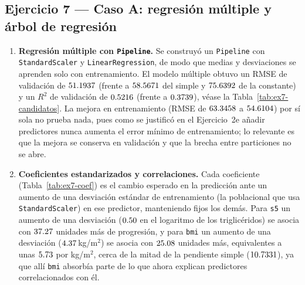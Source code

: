 \subsection{Ejercicio 7 --- Caso A: regresión múltiple y árbol de regresión}

\begin{enumerate}

\item \textbf{Regresión múltiple con \texttt{Pipeline}.}
Se construyó un \texttt{Pipeline} con \texttt{StandardScaler} y
\texttt{LinearRegression}, de modo que medias y desviaciones se aprenden solo
con entrenamiento. El modelo múltiple obtuvo un RMSE de validación de
$51.1937$ (frente a $58.5671$ del simple y
$75.6392$ de la constante) y un $R^2$ de validación de
$0.5216$ (frente a $0.3739$), véase la
Tabla~\ref{tab:ex7-candidatos}. La mejora en entrenamiento (RMSE de
$63.3458$ a $54.6104$) por sí sola no prueba nada, pues como
se justificó en el Ejercicio~2e añadir predictores nunca aumenta el error
mínimo de entrenamiento; lo relevante es que la mejora se conserva en
validación y que la brecha entre particiones no se abre.

\item \textbf{Coeficientes estandarizados y correlaciones.}
Cada coeficiente (Tabla~\ref{tab:ex7-coef}) es el cambio esperado en la
predicción ante un aumento de una desviación estándar de entrenamiento (la
poblacional que usa \texttt{StandardScaler}) en ese predictor, manteniendo
fijos los demás. Para \texttt{s5} un aumento de una desviación
($0.50$ en el logaritmo de los triglicéridos) se asocia con
$37.27$ unidades más de progresión, y para \texttt{bmi} un aumento
de una desviación ($4.37$\,kg/m$^2$) se asocia con
$25.08$ unidades más, equivalentes a unas $5.73$ por
kg/m$^2$, cerca de la mitad de la pendiente simple ($10.7331$), ya que
allí \texttt{bmi} absorbía parte de lo que ahora explican predictores
correlacionados con él.

\begin{table}[H]
\centering
\small

\caption{Coeficientes estandarizados de la regresión múltiple, ordenados por magnitud absoluta (entrenamiento).}
\label{tab:ex7-coef}
\end{table}


\end{enumerate}
